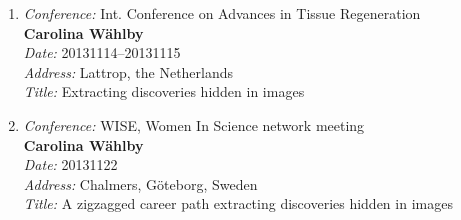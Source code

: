 \begin{enumerate}
\item 
{\em Conference:} Int. Conference on Advances in Tissue Regeneration~\\
{\bf Carolina W\"{a}hlby}~\\
{\em Date:} 20131114--20131115~\\
{\em Address:} Lattrop, the Netherlands~\\
{\em Title:} Extracting discoveries hidden in images

\item 
{\em Conference:} WISE, Women In Science network meeting~\\
{\bf Carolina W\"{a}hlby}~\\
{\em Date:} 20131122~\\
{\em Address:} Chalmers, G\"{o}teborg, Sweden~\\
{\em Title:} A zigzagged career path extracting discoveries hidden in images



\end{enumerate}


